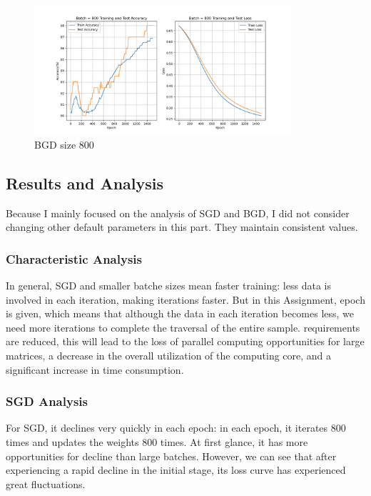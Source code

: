 \documentclass{article}
\begin{document}
\begin{figure}[!htbp]
    \centering
    \includegraphics[width=0.85\textwidth]{img/Part2/curve_batch_800.png}
    \caption{BGD size 800}
    \label{fig:p2batch800}
\end{figure}

\subsection{Results and Analysis}

Because I mainly focused on the analysis of SGD and BGD, I did not consider changing other default parameters in this part. They maintain consistent values.

\subsubsection{Characteristic Analysis}

In general, SGD and smaller batche sizes mean faster training: less data is involved in each iteration, making iterations faster. But in this Assignment, epoch is given, which means that although the data in each iteration becomes less, we need more iterations to complete the traversal of the entire sample. requirements are reduced, this will lead to the loss of parallel computing opportunities for large matrices, a decrease in the overall utilization of the computing core, and a significant increase in time consumption.

\subsubsection{SGD Analysis}

For SGD, it declines very quickly in each epoch: in each epoch, it iterates 800 times and updates the weights 800 times. At first glance, it has more opportunities for decline than large batches. However, we can see that after experiencing a rapid decline in the initial stage, its loss curve has experienced great fluctuations.
\end{document}
